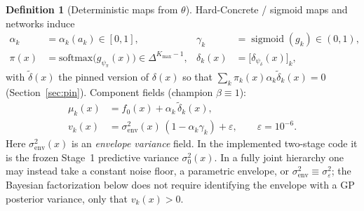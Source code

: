\documentclass[11pt,a4paper]{article}
\theoremstyle{plain}
\theoremstyle{definition}
\newtheorem{definition}[theorem]{Definition}
\theoremstyle{remark}
\newcommand{\tht}{\theta}
\newcommand{\sigmoid}{\operatorname{sigmoid}}
\newcommand{\Kmax}{K_{\max}}
\newcommand{\simplex}{\Delta}
\begin{document}
\begin{definition}[Deterministic maps from \(\tht\)]
Hard-Concrete / sigmoid maps and networks induce
\begin{align*}
  \alpha_k
  &=
  \alpha_k(a_k)
  \in[0,1],
  &
  \gamma_k
  &=
  \sigmoid(g_k)
  \in(0,1),
  \\
  \pi(x)
  &=
  \mathrm{softmax}\bigl(g_{\psi_\pi}(x)\bigr)
  \in\simplex^{\Kmax-1},
  &
  \delta_k(x)
  &=
  \bigl[\delta_{\psi_\delta}(x)\bigr]_k,
\end{align*}
with \(\tilde\delta(x)\) the pinned version of \(\delta(x)\) so that
\(\sum_k\pi_k(x)\alpha_k\tilde\delta_k(x)=0\) (Section~\ref{sec:pin}).
Component fields (champion \(\beta\equiv 1\)):
\begin{equation}
  \begin{aligned}
  \mu_k(x)
  &=
  f_0(x)+\alpha_k\,\tilde\delta_k(x),
  \\
  v_k(x)
  &=
  \sigma_{\mathrm{env}}^2(x)\,(1-\alpha_k\gamma_k)+\varepsilon,
  \qquad
  \varepsilon=10^{-6}.
  \end{aligned}
  \label{eq:bayes-comp}
\end{equation}
Here \(\sigma_{\mathrm{env}}^2(x)\) is an \emph{envelope variance} field.
In the implemented two-stage code it is the frozen Stage~1 predictive variance
\(\sigma_0^2(x)\). In a fully joint hierarchy one may instead take a constant noise
floor, a parametric envelope, or \(\sigma_{\mathrm{env}}^2\equiv\sigma_\varepsilon^2\);
the Bayesian factorization below does not require identifying the envelope with a GP
posterior variance, only that \(v_k(x)>0\).
\end{definition}
\end{document}
